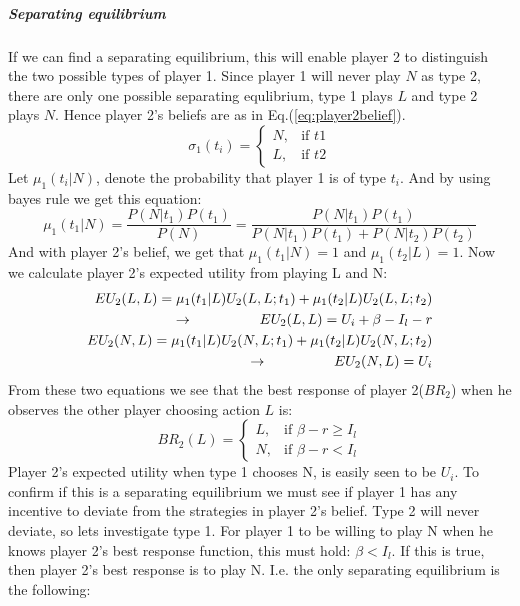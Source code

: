\subparagraph{Separating equilibrium}
If we can find a separating equilibrium, this will enable player 2 to distinguish the two possible types of player 1.
Since player 1 will never play $N$ as type 2, there are only one possible separating equlibrium, type 1 plays $L$ and type 2 plays $N$. Hence player 2's beliefs are as in Eq.(\ref{eq:player2belief}).
\begin{equation}
    \sigma_{1}(t_{i})= 
\begin{cases}
   N,& \text{if } t1\\
   L,& \text{if } t2  
\end{cases}
\label{eq:player2belief}
\end{equation}
Let $\mu_{1}(t_{i} | N )$, denote the probability that player 1 is of type $t_{i}$. And by using bayes rule we get this equation:
\begin{equation}
\mu_{1}(t_{1} | N )=\frac{P(N|t_{1})P(t_{1})}{P(N)}=\frac{P(N|t_{1})P(t_{1})}{P(N|t_{1})P(t_{1})+P(N|t_{2})P(t_{2})}
\end{equation}
And with player 2's belief, we get that $\mu_{1}(t_{1} | N )=1$ and $\mu_{1}(t_{2} | L )= 1 $. Now we calculate player 2's expected utility from playing L and N:
\begin{eqnarray}
EU_{2}(L,L)=\mu_{1}(t_{1} | L )U_{2}(L,L;t_{1})+\mu_{1}(t_{2} | L )U_{2}(L,L;t_{2}) \nonumber\\
\llap{$\rightarrow$\hspace{50pt}}EU_{2}(L,L)=U_{i}+\beta-I_{l}-r \\
EU_{2}(N,L)=\mu_{1}(t_{1} | L )U_{2}(N,L;t_{1})+\mu_{1}(t_{2} | L )U_{2}(N,L;t_{2})\nonumber\\
\llap{$\rightarrow$\hspace{50pt}}EU_{2}(N,L)=U_{i}
\end{eqnarray}
From these two equations we see that the best response of player 2($BR_2$) when he observes the other player choosing action $L$ is:
\begin{equation}
BR_{2}(L)=
\begin{cases}
L, & \text{if }\beta - r \geq I_{l}\\
N, & \text{if } \beta -r<I_{l}
\end{cases}
\label{eq:insuredBR}
\end{equation}
Player 2's expected utility when type 1 chooses N, is easily seen to be $U_{i}$. 
To confirm if this is a separating equilibrium we must see if player 1 has any incentive to deviate from the strategies in player 2's belief.
Type 2 will never deviate, so lets investigate type 1.
For player 1 to be willing to play N when he knows player 2's best response function, this must hold: $\beta<I_{l}$. If this is true, then player 2's best response is to play N. I.e. the only separating equilibrium is the following:

